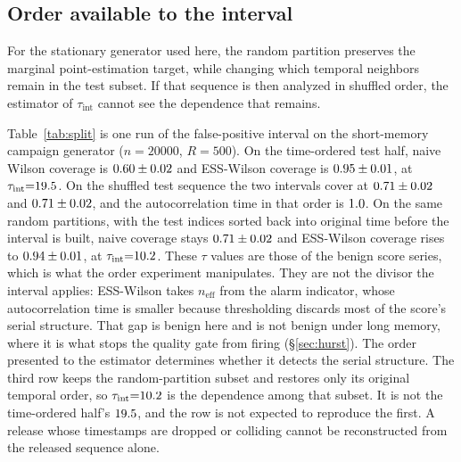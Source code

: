 \documentclass[a4paper,fleqn]{cas-dc}
\newcommand{\neff}{n_{\mathrm{eff}}}
\newcommand{\tabwidth}{\columnwidth}
\newcommand{\tabbody}{\small\setlength{\tabcolsep}{3.5pt}\renewcommand{\arraystretch}{1.08}}
\newcommand{\onetab}{\renewcommand{\tabwidth}{\columnwidth}\tabbody}
\begin{document}
\subsection{Order available to the interval}\label{sec:split}
For the stationary generator used here, the random partition preserves the marginal
point-estimation target, while changing which temporal neighbors remain in the test subset. If
that sequence is then analyzed
in shuffled order, the estimator of $\tau_{\mathrm{int}}$ cannot see the dependence that remains.

Table~\ref{tab:split} is one run of the false-positive interval on the short-memory campaign
generator ($n{=}20000$, $R{=}500$). On the time-ordered test half, naive Wilson coverage is
$0.60\pm0.02$ and ESS-Wilson coverage is $0.95\pm0.01$, at $\tau_{\mathrm{int}}{=}19.5$. On the
shuffled test sequence the two intervals cover at $0.71\pm0.02$ and $0.71\pm0.02$, and the
autocorrelation time in that order is $1.0$. On the same random partitions, with the test
indices sorted back into original time before the interval is built, naive coverage stays
$0.71\pm0.02$ and ESS-Wilson coverage rises to $0.94\pm0.01$, at
$\tau_{\mathrm{int}}{=}10.2$. These $\tau$ values are those of the benign score series, which
is what the order experiment manipulates. They are not the divisor the interval applies: ESS-Wilson
takes $\neff$ from the alarm indicator, whose autocorrelation time is smaller because thresholding
discards most of the score's serial structure. That gap is benign here and is not benign under long
memory, where it is what stops the quality gate from firing (\S\ref{sec:hurst}). The order presented to the estimator
determines whether it detects the serial structure. The third row keeps the random-partition subset
and restores only its original temporal order, so $\tau_{\mathrm{int}}{=}10.2$ is the dependence
among that subset. It is not the time-ordered half's $19.5$, and the row is not expected to
reproduce the first. A release whose timestamps are dropped or colliding cannot be reconstructed
from the released sequence alone.
\begin{table}[ht]
\centering
\caption{False-positive coverage by the order the interval is allowed to see. ESS-Wilson is the
plug-in of \S\ref{sec:instrument}. The third row preserves the random-partition subset and restores
only its original temporal ordering; it is therefore not expected to reproduce the time-ordered
test-half $\tau$. $\tau$ is the mean Geyer autocorrelation time of the benign \emph{scores} in the
order the interval saw; the ESS-Wilson divisor is the alarm indicator's, which is smaller.
$n{=}20000$, $R{=}500$, seed 1. From
\texttt{results/split\_order\_arms.csv}.}\label{tab:split}
\onetab

\end{table}
\end{document}
